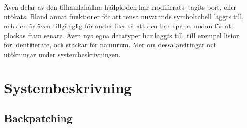 		Även delar av den tilhandahållna hjälpkoden har modifierats, tagits bort, eller utökats. Bland annat funktioner för att rensa nuvarande symboltabell laggts till, och den är även tillgänglig för andra filer så att den kan sparas undan för att plockas fram senare. Även nya egna datatyper har laggts till, till exempel listor för identifierare, och stackar för namnrum. Mer om dessa ändringar och utökningar under systembeskrivningen.



\section{Systembeskrivning}


	\subsection{Backpatching}
